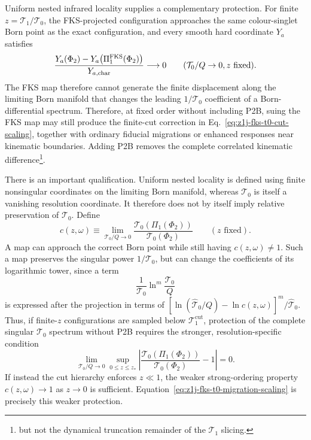 \documentclass[11pt]{article}
\newcommand{\cut}{\mathrm{cut}}
\newcommand{\Ph}{\Phi}
\begin{document}
Uniform nested infrared locality supplies a complementary protection. For finite
$z=\mathcal T_1/\mathcal T_0$, the FKS-projected configuration approaches the same colour-singlet Born point
as the exact configuration, and every smooth hard coordinate $Y_a$ satisfies
\begin{equation}
\frac{
Y_a(\Ph_2)-Y_a\!\left(\Pi_1^{\rm FKS}(\Ph_2)\right)
}{Y_{a,\rm char}}
\longrightarrow0
\qquad
(\mathcal T_0/Q\to0, z\text{ fixed}).
\label{eq:z1j-fks-lower-uniform-locality}
\end{equation}
The FKS map therefore cannot generate the finite displacement along the limiting Born manifold that changes
the leading $1/\mathcal T_0$ coefficient of a Born-differential spectrum. Therefore, at fixed order without including P2B, suing the FKS map  may
still produce the finite-cut correction in Eq.~\eqref{eq:z1j-fks-t0-cut-scaling}, together with ordinary
fiducial migrations or enhanced responses near kinematic boundaries. Adding P2B removes the complete correlated
kinematic difference\footnote{but not the dynamical truncation remainder of the $\mathcal T_1$ slicing.}.

There is an important qualification. Uniform nested locality is defined using finite nonsingular
coordinates on the limiting Born manifold, whereas $\mathcal T_0$ is itself a vanishing resolution
coordinate. It therefore does not by itself imply relative preservation of $\mathcal T_0$. Define
\begin{equation}
c(z,\omega)
\equiv
\lim_{\mathcal T_0/Q\to0}
\frac{
\mathcal T_0\!\left(\Pi_1(\Ph_2)\right)
}{
\mathcal T_0(\Ph_2)
}
\qquad (z\text{ fixed}).
\label{eq:outer-resolution-map-ratio}
\end{equation}
A map can approach the correct Born point while still having $c(z,\omega)\neq1$. Such a map preserves the
singular power $1/\mathcal T_0$, but can change the coefficients of its logarithmic tower, since a term
\begin{equation}
\frac{1}{\mathcal T_0}
\ln^m\!\frac{\mathcal T_0}{Q}
\end{equation}
is expressed after the projection in terms of
$[\ln(\widehat{\mathcal T}_0/Q)-\ln c(z,\omega)]^m/\widehat{\mathcal T}_0$.
Thus, if finite-$z$ configurations are sampled below $\mathcal T_1^{\cut}$, protection of the complete
singular $\mathcal T_0$ spectrum without P2B requires the stronger, resolution-specific condition
\begin{equation}
\lim_{\mathcal T_0/Q\to0}
\sup_{0\le z\le z_*}
\left|
\frac{
\mathcal T_0\!\left(\Pi_1(\Ph_2)\right)
}{
\mathcal T_0(\Ph_2)
}
-1
\right|
=0.
\label{eq:uniform-relative-t0-preservation}
\end{equation}
If instead the cut hierarchy enforces $z\ll1$, the weaker strong-ordering property $c(z,\omega)\to1$ as
$z\to0$ is sufficient. Equation~\eqref{eq:z1j-fks-t0-migration-scaling} is precisely this weaker protection.
\end{document}
